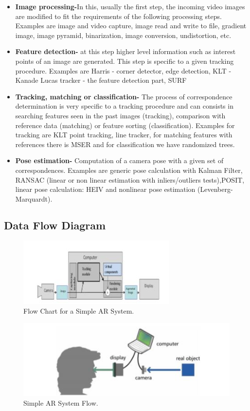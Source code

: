 \documentclass{article}
\begin{document}
\begin{itemize}
\item \textbf{Image processing-}In this, usually the ﬁrst step, the incoming video images are modiﬁed to ﬁt the requirements of the following processing steps. Examples are image and video capture, image read and write to ﬁle, gradient image, image pyramid, binarization, image conversion, undistortion, etc. 
\item \textbf{Feature detection-} at this step higher level information such as interest points of an image are generated. This step is speciﬁc to a given tracking procedure. Examples are Harris - corner detector, edge detection, KLT - Kanade Lucas tracker - the feature detection part, SURF 
\item \textbf{Tracking, matching or classiﬁcation-} The process of correspondence determination is very speciﬁc to a tracking procedure and can consists in searching features seen in the past images (tracking), comparison with reference data (matching) or feature sorting (classiﬁcation). Examples for tracking are KLT point tracking, line tracker, for matching features with references there is MSER and for classiﬁcation we have randomized trees.  
\item \textbf{Pose estimation- } Computation of a camera pose with a given set of correspondences. Examples are generic pose calculation with Kalman Filter, RANSAC (linear or non linear estimation with inliers/outliers tests),POSIT, linear pose calculation: HEIV and nonlinear pose estimation (Levenberg-Marquardt). 
\end{itemize}

\subsection{Data Flow Diagram}
\begin{figure}[h]
	\includegraphics[width=\linewidth]{flowchart.jpg}
	\caption{Flow Chart for a Simple AR System. }
\end{figure}
\begin{figure}[h]
	\includegraphics[width=\linewidth]{Simple AR.jpg}
	\caption{Simple AR System Flow. }
\end{figure}
\end{document}
